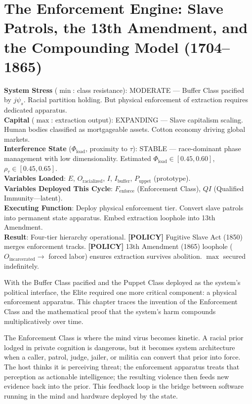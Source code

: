 \chapter{The Enforcement Engine: Slave Patrols, the 13th Amendment, and the Compounding Model (1704--1865)}
\label{ch:enforcement}

\begin{tcolorbox}[colback=black!5, colframe=black!70, fonttitle=\bfseries\ttfamily, title=RUNTIME LOG: 1704--1865 (AMERICAN SOUTH)]
\ttfamily\small
\textbf{System Stress} ($\min$: class resistance): MODERATE --- Buffer Class pacified by $j\psi_s$. Racial partition holding. But physical enforcement of extraction requires dedicated apparatus.\\
\textbf{Capital} ($\max$: extraction output): EXPANDING --- Slave capitalism scaling. Human bodies classified as mortgageable assets. Cotton economy driving global markets.\\
\textbf{Interference State} ($\Phi_{\text{load}}$, proximity to $\tau$): STABLE --- race-dominant phase management with low dimensionality. Estimated $\Phi_{\text{load}} \in [0.45, 0.60]$, $\rho_{\tau} \in [0.45, 0.65]$.\\
\textbf{Variables Loaded}: $E$, $O_{\text{racialized}}$, $I$, $I_{\text{buffer}}$, $P_{\text{uppet}}$ (prototype).\\
\textbf{Variables Deployed This Cycle}: $F_{\text{enforce}}$ (Enforcement Class), $QI$ (Qualified Immunity---latent).\\
\textbf{Executing Function}: Deploy physical enforcement tier. Convert slave patrols into permanent state apparatus. Embed extraction loophole into 13th Amendment.\\
\textbf{Result}: Four-tier hierarchy operational. \textbf{[POLICY]} Fugitive Slave Act (1850) merges enforcement tracks. \textbf{[POLICY]} 13th Amendment (1865) loophole ($O_{\text{incarcerated}} \rightarrow$ forced labor) ensures extraction survives abolition. $\max$ secured indefinitely.
\end{tcolorbox}

\medskip

With the Buffer Class pacified and the Puppet Class deployed as the system's political interface, the Elite required one more critical component: a physical enforcement apparatus. This chapter traces the invention of the Enforcement Class and the mathematical proof that the system's harm compounds multiplicatively over time.

The Enforcement Class is where the mind virus becomes kinetic. A racial prior lodged in private cognition is dangerous, but it becomes system architecture when a caller, patrol, judge, jailer, or militia can convert that prior into force. The host thinks it is perceiving threat; the enforcement apparatus treats that perception as actionable intelligence; the resulting violence then feeds new evidence back into the prior. This feedback loop is the bridge between software running in the mind and hardware deployed by the state.

